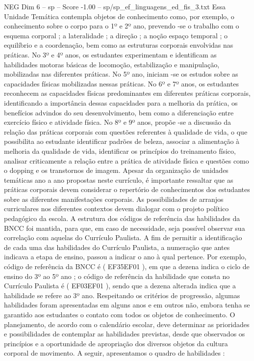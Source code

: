 \begin{textsample}{NEG Dim 6 – sp – Score -1.00 – sp/sp\_ef\_linguagens\_ed\_fis\_3.txt}
Essa Unidade Temática contempla objetos de conhecimento como, por exemplo, o conhecimento sobre o corpo para o 1º e 2º ano, prevendo -se o trabalho com o esquema corporal ; a lateralidade ; a direção ; a noção espaço temporal ; o equilíbrio e a coordenação, bem como as estruturas corporais envolvidas nas práticas.
No 3º e 4º anos, os estudantes experimentam e identificam as habilidades motoras básicas de locomoção, estabilização e manipulação, mobilizadas nas diferentes práticas.
No 5º ano, iniciam -se os estudos sobre as capacidades físicas mobilizadas nessas práticas.
No 6º e 7º anos, os estudantes reconhecem as capacidades físicas predominantes em diferentes práticas corporais, identificando a importância dessas capacidades para a melhoria da prática, os benefícios advindos do seu desenvolvimento, bem como a diferenciação entre exercício físico e atividade física.
No 8º e 9º anos, propõe -se a discussão da relação das práticas corporais com questões referentes à qualidade de vida, o que possibilita ao estudante identificar padrões de beleza, associar a alimentação à melhoria da qualidade de vida, identificar os princípios do treinamento físico, analisar criticamente a relação entre a prática de atividade física e questões como o dopping e os transtornos de imagem.
Apesar da organização de unidades temáticas ano a ano propostas neste currículo, é importante ressaltar que as práticas corporais devem considerar o repertório de conhecimentos dos estudantes sobre as diferentes manifestações corporais.
As possibilidades de arranjos curriculares nos diferentes contextos devem dialogar com o projeto político pedagógico da escola.
A estrutura dos códigos de referência das habilidades da BNCC foi mantida, para que, em caso de necessidade, seja possível observar sua correlação com aquelas do Currículo Paulista.
A fim de permitir a identificação de cada uma das habilidades do Currículo Paulista, a numeração que antes indicava a etapa de ensino, passou a indicar o ano à qual pertence.
Por exemplo, código de referência da BNCC é ( EF35EF01 ), em que a dezena indica o ciclo de ensino do 3º ao 5º ano ; o código de referência da habilidade que consta no Currículo Paulista é ( EF03EF01 ), sendo que a dezena alterada indica que a habilidade se refere ao 3º ano.
Respeitando os critérios de progressão, algumas habilidades foram apresentadas em alguns anos e em outros não, embora tenha se garantido aos estudantes o contato com todos os objetos de conhecimento.
O planejamento, de acordo com o calendário escolar, deve determinar as prioridades e possibilidades de contemplar as habilidades previstas, desde que observados os princípios e a oportunidade de apropriação dos diversos objetos da cultura corporal de movimento.
A seguir, apresentamos o quadro de habilidades :

\end{textsample}
